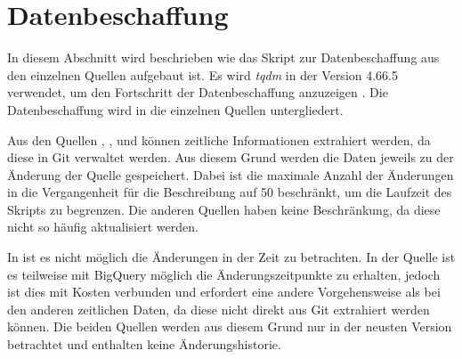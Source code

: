 \section{Datenbeschaffung}
\label{sec:datenbeschaffung}
In diesem Abschnitt wird beschrieben wie das Skript zur Datenbeschaffung aus den einzelnen Quellen aufgebaut ist.
Es wird \emph{tqdm} in der Version 4.66.5 verwendet, um den Fortschritt der Datenbeschaffung anzuzeigen \autocite{costa-luis_tqdm_2024}.
Die Datenbeschaffung wird in die einzelnen Quellen untergliedert.

Aus den Quellen , ,  und  können zeitliche Informationen extrahiert werden, da diese in Git verwaltet werden.
Aus diesem Grund werden die Daten jeweils zu der Änderung der Quelle gespeichert.
Dabei ist die maximale Anzahl der Änderungen in die Vergangenheit für die Beschreibung auf 50 beschränkt, um die Laufzeit des Skripts zu begrenzen.
Die anderen Quellen haben keine Beschränkung, da diese nicht so häufig aktualisiert werden.

In  ist es nicht möglich die Änderungen in der Zeit zu betrachten.
In der  Quelle ist es teilweise mit BigQuery möglich die Änderungszeitpunkte zu erhalten, jedoch ist dies mit Kosten verbunden und erfordert eine andere Vorgehensweise als bei den anderen zeitlichen Daten, da diese nicht direkt aus Git extrahiert werden können.
Die beiden Quellen werden aus diesem Grund nur in der neusten Version betrachtet und enthalten keine Änderungshistorie.

